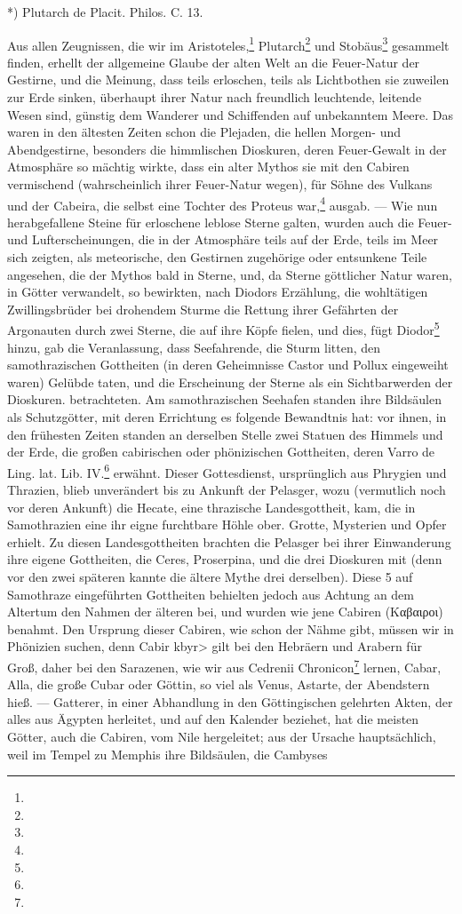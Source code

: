 \documentclass[a4paper, 11pt, oneside, polutonikogreek, german]{article}
\begin{document}
*) Plutarch de Placit. Philos. C. 13.

Aus allen Zeugnissen, die wir im Aristoteles,\footnote{} Plutarch\footnote{} und Stobäus\footnote{} gesammelt finden, erhellt der allgemeine Glaube der alten Welt an die Feuer-Natur der Gestirne, und die Meinung, dass teils erloschen, teils als Lichtbothen sie zuweilen zur Erde sinken, überhaupt ihrer Natur nach freundlich leuchtende, leitende Wesen sind, günstig dem Wanderer und Schiffenden auf unbekanntem Meere. Das waren in den ältesten Zeiten schon die Plejaden, die hellen Morgen- und Abendgestirne, besonders die himmlischen Dioskuren, deren Feuer-Gewalt in der Atmosphäre so mächtig wirkte, dass ein alter Mythos sie mit den Cabiren vermischend (wahrscheinlich ihrer Feuer-Natur wegen), für Söhne des Vulkans und der Cabeira, die selbst eine Tochter des Proteus war,\footnote{} ausgab. --- Wie nun herabgefallene Steine für erloschene leblose Sterne galten, wurden auch die Feuer- und Lufterscheinungen, die in der Atmosphäre teils auf der Erde, teils im Meer sich zeigten, als meteorische, den Gestirnen zugehörige oder entsunkene Teile angesehen, die der Mythos bald in Sterne, und, da Sterne göttlicher Natur waren, in Götter verwandelt, so bewirkten, nach Diodors Erzählung, die wohltätigen Zwillingsbrüder bei drohendem Sturme die Rettung ihrer Gefährten der Argonauten durch zwei Sterne, die auf ihre Köpfe fielen, und dies, fügt Diodor\footnote{} hinzu, gab die Veranlassung, dass Seefahrende, die Sturm litten, den samothrazischen Gottheiten (in deren Geheimnisse Castor und Pollux eingeweiht waren) Gelübde taten, und die Erscheinung der Sterne als ein Sichtbarwerden der Dioskuren. betrachteten. Am samothrazischen Seehafen standen ihre Bildsäulen als Schutzgötter, mit deren Errichtung es folgende Bewandtnis hat: vor ihnen, in den frühesten Zeiten standen an derselben Stelle zwei Statuen des Himmels und der Erde, die großen cabirischen oder phönizischen Gottheiten, deren Varro de Ling. lat. Lib. IV.\footnote{} erwähnt. Dieser Gottesdienst, ursprünglich aus Phrygien und Thrazien, blieb unverändert bis zu Ankunft der Pelasger, wozu (vermutlich noch vor deren Ankunft) die Hecate, eine thrazische Landesgottheit, kam, die in Samothrazien eine ihr eigne furchtbare Höhle ober. Grotte, Mysterien und Opfer erhielt. Zu diesen Landesgottheiten brachten die Pelasger bei ihrer Einwanderung ihre eigene Gottheiten, die Ceres, Proserpina, und die drei Dioskuren mit (denn vor den zwei späteren kannte die ältere Mythe drei derselben). Diese 5 auf Samothraze eingeführten Gottheiten behielten jedoch aus Achtung an dem Altertum den Nahmen der älteren bei, und wurden wie jene Cabiren (Καβαιροι) benahmt. Den Ursprung dieser Cabiren, wie schon der Nähme gibt, müssen wir in Phönizien suchen, denn Cabir \<kbyr> gilt bei den Hebräern und Arabern für Groß, daher bei den Sarazenen, wie wir aus Cedrenii Chronicon\footnote{} lernen, Cabar, Alla, die große Cubar oder Göttin, so viel als Venus, Astarte, der Abendstern hieß. --- Gatterer, in einer Abhandlung in den Göttingischen gelehrten Akten, der alles aus Ägypten herleitet, und auf den Kalender beziehet, hat die meisten Götter, auch die Cabiren, vom Nile hergeleitet; aus der Ursache hauptsächlich, weil im Tempel zu Memphis ihre Bildsäulen, die Cambyses 
\end{document}
